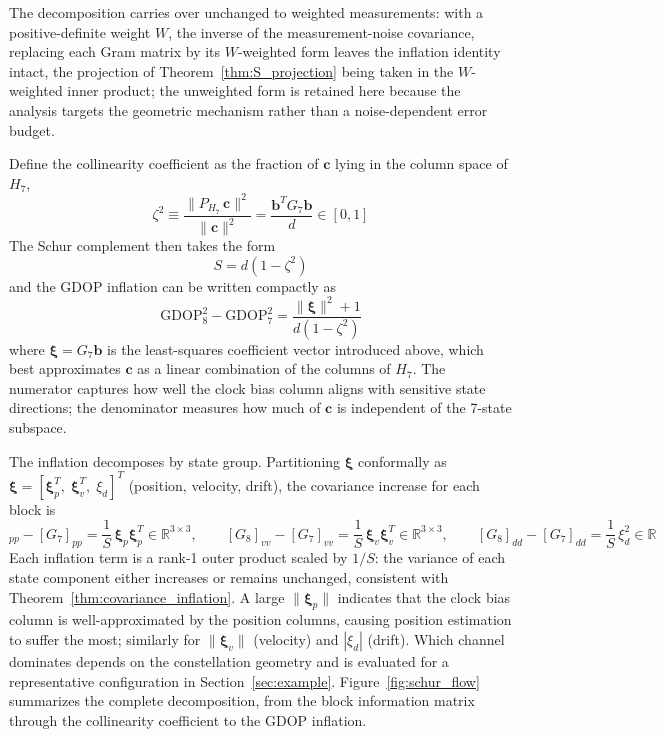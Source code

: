 \documentclass[letterpaper,times]{IONconf-v2}
\theoremstyle{plain}
\theoremstyle{remark}
\begin{document}
The decomposition carries over unchanged to weighted measurements: with a positive-definite weight $W$, the inverse of the measurement-noise covariance, replacing each Gram matrix by its $W$-weighted form leaves the inflation identity intact, the projection of Theorem~\ref{thm:S_projection} being taken in the $W$-weighted inner product; the unweighted form is retained here because the analysis targets the geometric mechanism rather than a noise-dependent error budget.

Define the collinearity coefficient as the fraction of $\mathbf{c}$ lying in the column space of $H_7$,
\begin{equation}\label{eq:rho_def}
\zeta^2 \equiv \frac{\|P_{H_7}\,\mathbf{c}\|^2}{\|\mathbf{c}\|^2} = \frac{\mathbf{b}^TG_7\mathbf{b}}{d} \in [0,1]
\end{equation}
The Schur complement then takes the form
\begin{equation}\label{eq:S_rho}
S = d(1 - \zeta^2)
\end{equation}
and the GDOP inflation can be written compactly as
\begin{equation}\label{eq:gdop_inflation_final}
\mathrm{GDOP}_8^2 - \mathrm{GDOP}_7^2 = \frac{\|\boldsymbol{\xi}\|^2 + 1}{d(1 - \zeta^2)}
\end{equation}
where $\boldsymbol{\xi} = G_7\mathbf{b}$ is the least-squares coefficient vector introduced above, which best approximates $\mathbf{c}$ as a linear combination of the columns of $H_7$. The numerator captures how well the clock bias column aligns with sensitive state directions; the denominator measures how much of $\mathbf{c}$ is independent of the 7-state subspace.

The inflation decomposes by state group. Partitioning $\boldsymbol{\xi}$ conformally as $\boldsymbol{\xi} = [\boldsymbol{\xi}_p^T,\; \boldsymbol{\xi}_v^T,\; \xi_d]^T$ (position, velocity, drift), the covariance increase for each block is
%
\begin{equation}
[G_8]_{pp} - [G_7]_{pp} = \frac{1}{S}\,\boldsymbol{\xi}_p\boldsymbol{\xi}_p^T \in \mathbb{R}^{3 \times 3}, \qquad
[G_8]_{vv} - [G_7]_{vv} = \frac{1}{S}\,\boldsymbol{\xi}_v\boldsymbol{\xi}_v^T \in \mathbb{R}^{3 \times 3}, \qquad
[G_8]_{dd} - [G_7]_{dd} = \frac{1}{S}\,\xi_d^2 \in \mathbb{R}
\label{eq:dop_inflation_all}
\end{equation}
%
Each inflation term is a rank-1 outer product scaled by $1/S$: the variance of each state component either increases or remains unchanged, consistent with Theorem~\ref{thm:covariance_inflation}. A large $\|\boldsymbol{\xi}_p\|$ indicates that the clock bias column is well-approximated by the position columns, causing position estimation to suffer the most; similarly for $\|\boldsymbol{\xi}_v\|$ (velocity) and $|\xi_d|$ (drift). Which channel dominates depends on the constellation geometry and is evaluated for a representative configuration in Section~\ref{sec:example}. Figure~\ref{fig:schur_flow} summarizes the complete decomposition, from the block information matrix through the collinearity coefficient to the GDOP inflation.
\end{document}
